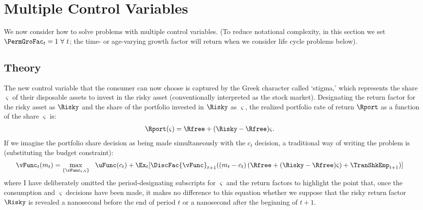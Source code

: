 \hypertarget{multiple-control-variables}{}
\section{Multiple Control Variables}

We now consider how to solve problems with multiple control variables.  (To reduce notational complexity, in this section we set $\PermGroFac_{t}=1~\forall~t$; the time- or age-varying growth factor will return when we consider life cycle problems below).

\subsection{Theory}\label{subsec:MCTheory}
The new control variable that the consumer can now choose is captured by the Greek character called `stigma,' which represents the  share $\varsigma$ of their disposable assets to invest in the risky asset (conventionally interpreted as the stock market).  Designating the return factor for the risky asset as $\Risky$ and the share of the portfolio invested in $\Risky$ as $\varsigma$, the realized portfolio rate of return $\Rport$ as a function of the share $\varsigma$ is:
\begin{equation}\begin{gathered}\begin{aligned}
      \Rport(\varsigma) &= \Rfree+(\Risky-\Rfree)\varsigma \label{eq:Shr}.
    \end{aligned}\end{gathered}\end{equation}
If we imagine the portfolio share decision as being made simultaneously with the ${c}_{t}$ decision, a traditional way of writing the problem is (substituting the budget constraint):
\begin{equation}\begin{gathered}\begin{aligned}
      {\vFunc}_{t}({m}_{t})  & = \max_{\{\cFunc_{t},\varsigma\}} ~~  \uFunc({c}_{t}) +  \Ex_{{t}}[\DiscFac {\vFunc}_{t+1}(({m}_{t}-{c}_{t})\left({\Rfree+(\Risky-\Rfree)\varsigma}\right) +        {\TranShkEmp}_{t+1})] \label{eq:Bellmanundated}
    \end{aligned}\end{gathered}\end{equation}
where I have deliberately omitted the period-designating subscripts for $\varsigma$ and the return factors to highlight the point that, once the consumption and $\varsigma$ decisions have been made, it makes no difference to this equation whether we suppose that the risky return factor $\Risky$ is revealed a nanosecond before the end of period $t$ or a nanosecond after the beginning of $t+1$.

